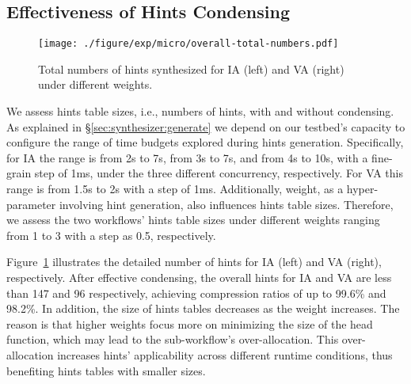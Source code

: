 \subsection{Effectiveness of Hints Condensing}
\label{exp:micro:condense}

\begin{figure}[!t]
\centering
\texttt{[image: ./figure/exp/micro/overall-total-numbers.pdf]}
\caption{Total numbers of hints synthesized for IA (left) and VA (right) under different weights.}
\label{fig:exp:condense:total-hints}
\end{figure}

We assess hints table sizes, i.e., numbers of hints, with and without condensing.
As explained in \S\ref{sec:synthesizer:generate} we depend on our testbed's capacity to configure the range of time budgets explored during hints generation.
Specifically, for IA the range is from 2s to 7s,  from 3s to 7s, and from 4s to 10s, with a fine-grain step of 1ms, under the three different concurrency, respectively.
For VA this range is from 1.5s to 2s with a step of 1ms.
Additionally, weight, as a hyper-parameter involving hint generation, also influences hints table sizes.
Therefore, we assess the two workflows' hints table sizes under different weights ranging from 1 to 3 with a step as 0.5, respectively.

Figure~\ref{fig:exp:condense:total-hints} illustrates the detailed number of hints for IA (left) and VA (right), respectively.
After effective condensing, the overall hints for IA and VA are less than 147 and 96 respectively, achieving compression ratios of up to 99.6\% and 98.2\%.
In addition, the size of hints tables decreases as the weight increases.
The reason is that higher weights focus more on minimizing the size of the head function, which may lead to the sub-workflow's over-allocation.
This over-allocation increases hints' applicability across different runtime conditions, thus benefiting hints tables with smaller sizes.



